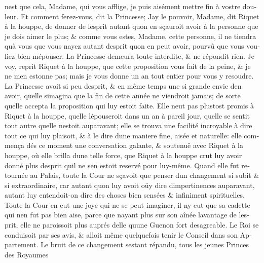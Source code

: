 \documentclass[14pt,a4paper]{memoir}
\begin{document}
{{\begin{otherlanguage}{french}
n\textquotesingle est que cela, Madame, qui vous afflige, je puis
aisément mettre fin à vostre douleur. Et comment ferez-vous, dit la
Princesse; J\textquotesingle ay le pouvoir, Madame, dit Riquet à la
houppe, de donner de l\textquotesingle esprit autant
qu\textquotesingle on en sçauroit avoir à la personne que je dois aimer
le plus; \& comme vous estes, Madame, cette personne, il ne tiendra
qu\textquotesingle à vous que vous n\textquotesingle ayez autant
d\textquotesingle esprit qu\textquotesingle on en peut avoir, pourvû que
vous vouliez bien m\textquotesingle épouser. La Princesse demeura toute
interdite, \& ne répondit rien. Je voy, reprit Riquet à la houppe, que
cette proposition vous fait de la peine, \& je ne m\textquotesingle en
estonne pas; mais je vous donne un an tout entier pour vous y resoudre.
La Princesse avoit si peu d\textquotesingle esprit, \& en même temps une
si grande envie d\textquotesingle en avoir, qu\textquotesingle elle
s\textquotesingle imagina que la fin de cette année ne viendroit jamais;
de sorte qu\textquotesingle elle accepta la proposition qui luy estoit
faite. Elle n\textquotesingle eut pas plustost promis à Riquet à la
houppe, qu\textquotesingle elle l\textquotesingle épouseroit dans un an
à pareil jour, qu\textquotesingle elle se sentit tout autre
qu\textquotesingle elle n\textquotesingle estoit auparavant; elle se
trouva une facilité incroyable à dire tout ce qui luy plaisoit, \& à le
dire d\textquotesingle une maniere fine, aisée et naturelle: elle
commença dés ce moment une conversation galante, \& soutenuë avec Riquet
à la houppe, où elle brilla d\textquotesingle une telle force, que
Riquet à la houppe crut luy avoir donné plus d\textquotesingle esprit
qu\textquotesingle il ne s\textquotesingle en estoit reservé pour
luy-même. Quand elle fut retournée au Palais, toute la Cour ne sçavoit
que penser d\textquotesingle un changement si subit \& si
extraordinaire, car autant qu\textquotesingle on luy avoit oüy dire
d\textquotesingle impertinences auparavant, autant luy entendoit-on dire
des choses bien sensées \& infiniment spirituelles. Toute la Cour en eut
une joye qui ne se peut imaginer, il n\textquotesingle y eut que sa
cadette qui n\textquotesingle en fut pas bien aise, parce que
n\textquotesingle ayant plus sur son aînée l\textquotesingle avantage de
l\textquotesingle esprit, elle ne paroissoit plus auprés
d\textquotesingle elle qu\textquotesingle une Guenon fort desagreable.
Le Roi se conduisoit par ses avis, \& alloit même quelquefois tenir le
Conseil dans son Appartement. Le bruit de ce changement
s\textquotesingle estant répandu, tous les jeunes Princes des Royaumes

\end{otherlanguage}}}
\end{document}
